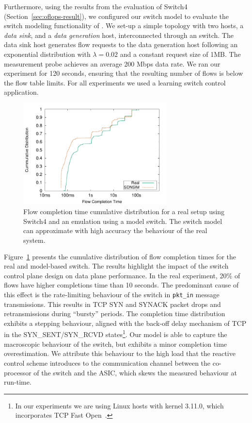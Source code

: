 Furthermore, using the results from the evaluation of Switch4 (Section~\ref{sec:oflops-result}),
we configured our switch model to evaluate the switch modeling functionality of \sdnsim.
We set-up a simple topology with two hosts, a \textit{data sink}, and a \textit{data generation} host,
interconnected through an \of switch. The data sink host generates flow
requests to the data generation host following an exponential distribution with
$\lambda=0.02$ and a constant request size of 1MB\@. The measurement probe achieves an average
200 Mbps data rate. We ran our experiment for 120 seconds, ensuring that the
resulting number of flows is below the flow table limits. For all experiments we
used a learning switch control application.

\begin{figure}[t] 
  \centering
  \includegraphics[width=0.70\textwidth]{Chapter1/Chapter1Figs/2hosts-cumm} 
  \caption[Flow completion time cumulative distribution using Switch4 and an
  \sdnsim emulation model]{Flow completion time cumulative distribution for a
  real setup using Switch4 and an \sdnsim emulation using a model switch. The
  switch model can approximate with high accuracy the behaviour of the
  real system.} 
  \label{fig:eval:switch-perf} 
\end{figure}


Figure~\ref{fig:eval:switch-perf} presents the cumulative distribution of flow
completion times for the real and model-based switch. The results highlight the
impact of the switch control plane design on data plane performance.  In the
real experiment, 20\% of flows have higher completions time than 10 seconds.
The predominant cause of this effect is the rate-limiting behaviour of the
switch in \texttt{pkt\_in} message transmissions. This results in TCP SYN and
SYNACK packet drops and retransmissions during ``bursty'' periods. The
completion time distribution exhibits a stepping behaviour, aligned with the
back-off delay mechanism of TCP in the SYN\_SENT/SYN\_RCVD states\footnote{In
    our experiments we are using Linux hosts with kernel 3.11.0, which
incorporates TCP Fast Open~\cite{Cheng13}.}. Our model is able to capture the
macroscopic behaviour of the switch, but exhibits a minor completion time
overestimation. We attribute this behaviour to the high load that the reactive
control scheme introduces to the communication channel between the co-processor
of the switch and the ASIC, which skews the measured behaviour at run-time.

